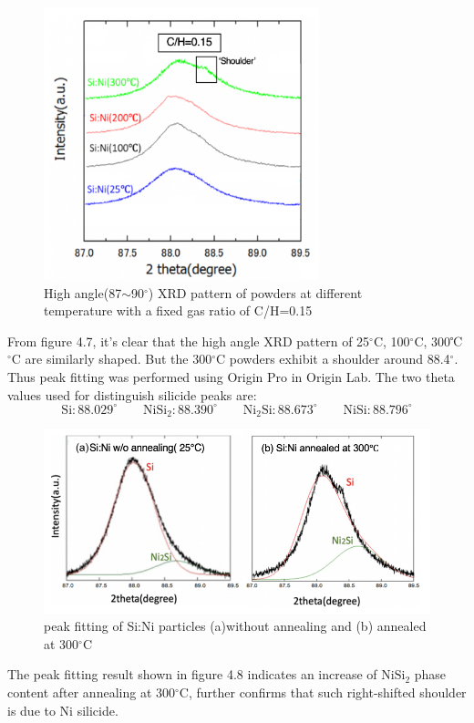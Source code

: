 \begin{figure}[H]
\centering
\includegraphics[width=8cm]{src/fig/fig48.png}
\caption{High angle(87$\sim$90\(^\circ\)) XRD pattern of powders at different temperature with a fixed gas ratio of C/H=0.15}
\end{figure}
From figure 4.7, it’s clear that the high angle XRD pattern of 25\(^\circ\)C, 100\(^\circ\)C, 300℃\(^\circ\)C are similarly shaped. But the 300\(^\circ\)C powders exhibit a shoulder around 88.4\(^\circ\). Thus peak fitting was performed using Origin Pro in Origin Lab. The two theta values used for distinguish silicide peaks are:
$$ \mathrm{Si}: 88.029^{\circ} \qquad  \mathrm{NiSi_{2}}: 88.390^{\circ}\qquad  \mathrm{Ni_{2}Si}: 88.673^{\circ}\qquad \mathrm{ NiSi}: 88.796^{\circ}$$
\begin{figure}[H]
\centering
\includegraphics[width=12cm]{src/fig/fig49.png}
\caption{peak fitting of Si:Ni particles (a)without annealing  and (b)  annealed at 300\(^\circ\)C }
\end{figure}
The peak fitting result shown in figure 4.8 indicates an increase of $\mathrm{NiSi_{2}}$ phase content after annealing at 300\(^\circ\)C, further confirms that such right-shifted shoulder is due to Ni silicide. \\
